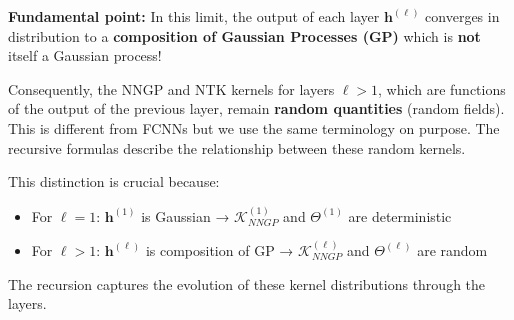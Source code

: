 \documentclass[11pt]{article}
\begin{document}
\begin{tcolorbox}[colback=red!10,colframe=red!80!black,title={\textbf{Crucial Remark: Composition of Gaussian Processes}},enhanced,drop shadow,boxrule=2pt]
\textbf{Fundamental point:} In this limit, the output of each layer $\bm{h}^{(\ell)}$ converges in distribution to a \textbf{composition of Gaussian Processes (GP)} which is \textbf{not} itself a Gaussian process!

Consequently, the NNGP and NTK kernels for layers $\ell > 1$, which are functions of the output of the previous layer, 
remain \textbf{random quantities} (random fields). This is different from FCNNs but we use the same terminology on purpose.
The recursive formulas describe the relationship between these random kernels.

This distinction is crucial because:
\begin{itemize}
\item For $\ell = 1$: $\bm{h}^{(1)}$ is Gaussian → $\mathcal{K}_{NNGP}^{(1)}$ and $\Theta^{(1)}$ are deterministic
\item For $\ell > 1$: $\bm{h}^{(\ell)}$ is composition of GP → $\mathcal{K}_{NNGP}^{(\ell)}$ and $\Theta^{(\ell)}$ are random
\end{itemize}

The recursion captures the evolution of these kernel distributions through the layers.
\end{tcolorbox}
\end{document}
